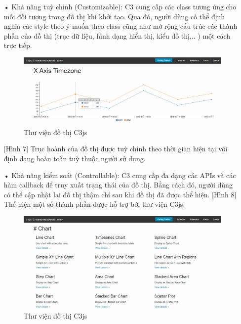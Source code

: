 \documentclass[12pt,a4paper]{article}
\begin{document}
\begin{itemize}
        \item[•]Khả năng tuỳ chỉnh (Customizable):
        C3 cung cấp các class tương ứng cho mỗi đối tượng trong đồ thị khi khởi tạo. Qua đó, người dùng có thể định nghĩa các style theo ý muốn theo class cũng như mở rộng cấu trúc các thành phần của đồ thị (trục dữ liệu, hình dạng hiển thị, kiểu đồ thị,.. ) một cách trực tiếp.
\begin{figure}[htp]
	\begin{center}
    \includegraphics[scale=.4]{image/c3custom}
    \caption{Thư viện đồ thị C3js}
    \label{refhinh7}
	\end{center}
\end{figure}      
[Hình 7] Trục hoành của đồ thị được tuỳ chỉnh theo thời gian hiện tại với định dạng hoàn toàn tuỳ thuộc người sử dụng.
 
        \item[•]Khả năng kiểm soát (Controllable):
        C3 cung cấp đa dạng các APIs và các hàm callback để truy xuất trạng thái của đồ thị. Bằng cách đó, người dùng có thể cập nhật lại đồ thị thậm chí sau khi đồ thị đã được thể hiện. [Hình 8] Thể hiện một số thành phần được hỗ trợ bởi thư viện C3js.
\begin{figure}[htp]
	\begin{center}
    \includegraphics[scale=.4]{image/c3apis}
    \caption{Thư viện đồ thị C3js}
    \label{refhinh8}
	\end{center}
\end{figure}

\end{itemize}
\end{document}
